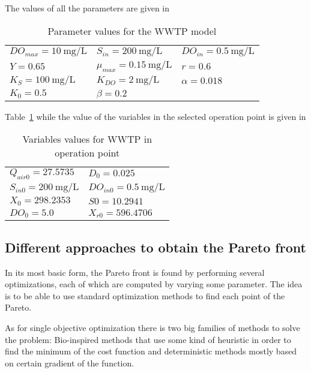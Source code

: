 The values of all the parameters are given in %
\begin{table}
	\centering
	\caption{Parameter values for the WWTP model}
	\begin{tabular}{lll}
		\toprule
		$DO_{max} = \SI{10}{\milli\gram\per\liter}$ & $S_{in} = \SI{200}{\milli\gram\per\liter}$ & $DO_{in} = \SI{0.5}{\milli\gram\per\liter}$\\
		$Y = 0.65$ & $\mu_{max} = \SI{0.15}{\milli\gram\per\liter}$ & $r = 0.6$ \\
		$K_S = \SI{100}{\milli\gram\per\liter}$ & $K_{DO} = \SI{2}{\milli\gram\per\liter}$ & $\alpha = 0.018$ \\
		$K_0 = 0.5$ & $\beta = 0.2$\\
		\bottomrule
	\end{tabular}
	\label{tab:ParamValues}
\end{table}
%
Table~\ref{tab:ParamValues} while the value of the variables in the selected operation point is given in %
%
\begin{table}[tb]
	\centering
	\caption{Variables values for WWTP in operation point}
	\begin{tabular}{ll}
		\toprule
		$Q_{air0} = 27.5735$ & $D_0 =  0.025$ \\
		$S_{in0} = \SI{200}{\milli\gram\per\liter}$ & $DO_{in0} = \SI{0.5}{\milli\gram\per\liter}$\\
		$X_0 = 298.2353$ & $S0 = 10.2941$\\
		$DO_0 = 5.0$ & $X_{r0} = 596.4706$\\
		\bottomrule
	\end{tabular}
\end{table}
\subsection{Different approaches to obtain the Pareto front}
\label{sec:ParetoApproach}
In its most basic form, the Pareto front is found by performing several optimizations, each of which are computed by varying some parameter. The idea is to be able to use standard optimization methods to find each point of the Pareto.

As for single objective optimization there is two big families of methods to solve the problem: Bio-inspired methods that use some kind of heuristic in order to find the minimum of the cost function and deterministic methods mostly based on certain gradient of the function.

